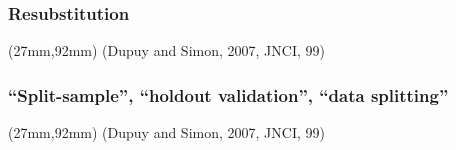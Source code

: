 \begin{frame}
  \frametitle{Resubstitution}
  \vspace*{-5cm}
   \textblockcolour{}
  \TPMargin{0pt}
  \begin{textblock*}{43mm}(27mm,92mm)
    \textblockcolour{}
    {\tiny(Dupuy and Simon, 2007, JNCI, 99)}
  \end{textblock*}
   \textblockcolour{}
\end{frame}



\begin{frame}
  \frametitle{``Split-sample'', ``holdout validation'', ``data splitting''}
  \vspace*{-5cm}
  
  \TPMargin{0pt}
  \begin{textblock*}{43mm}(27mm,92mm)
    {\tiny(Dupuy and Simon, 2007, JNCI, 99)}
  \end{textblock*}
  
\end{frame}



